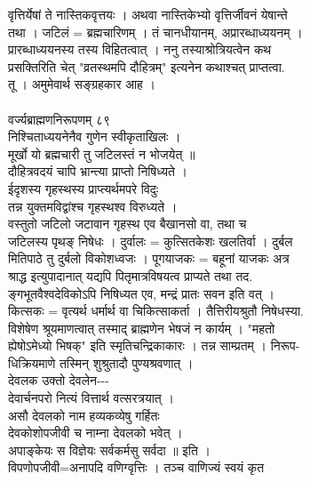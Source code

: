 \documentclass[11pt, openany]{book}
\begin{document}
{{{{{{{{{{{{{{{{{{{{{{{{{{{{{{{{{{{{{{{{{{{{{{{{{{{{{{{{{{{{{{{{{{{{{{{{{{{{{{{{{{{{{{{{{{{{{{{{{{{{{{{{{{{{{{{{{{{{{{{{{{{{{{{{{{{{{{{{{{{{{वृत्तिर्येषां ते नास्तिकवृत्तयः । अथवा नास्तिकेभ्यो वृत्तिर्जीवनं
येषान्ते\\
}{तथा}{ । जटिलं = ब्रह्मचारिणम् । तं चानधीयानम्, अप्रारब्धाध्ययनम् ।\\
प्रारब्धाध्ययनस्य }{तस्य}{ विहितत्वात् । ननु तस्याश्रोत्रियत्वेन कथ\\
प्रसक्तिरिति चेत् "व्रतस्थमपि दौहित्रम्" इत्यनेन कथाश्चत् प्राप्तत्वा.\\
तू । अमुमेवार्थ सङ्ग्रहकार आह ।\\
~\\


{ }{वर्ज्यब्राह्मणनिरूपणम् \textbar{}}{ ८९\\
निश्चिताध्ययनेनैव गुणेन स्वीकृताखिलः ।\\
मूर्खो यो ब्रह्मचारी तु जटिलस्तं न भोजयेत् ॥\\
दौहित्रवदयं चापि भ्रान्त्या प्राप्तो निषिध्यते ।\\
ईदृशस्य गृहस्थस्य प्राप्त्यर्थमपरे विदुः }{\textbar{}\textbar{}}{\\
तन्न युक्तमविद्वांश्च गृहस्थश्व विरुध्यते ।\\
वस्तुतो जटिलो जटावान गृहस्थ एव बैखानसो }{वा, तथा}{ च\\
जटिलस्य पृथङ् निषेधः । दुर्वालः = कुत्सितकेशः खलतिर्वा । दुर्बल\\
मितिपाठे तु दुर्बलो विकोशध्वजः । पूगयाजकः = बहूनां याजकः }{\textbar{}}{
अत्र\\
श्राद्ध इत्युपादानात् यद्यपि पितृमात्रविषयत्व प्राप्यते}{ तथा}{ तद.\\
ङ्गभूतवैश्वदेविकोऽपि निषिध्यत एव, मन्द्रं प्रातः सवन इति वत् ।\\
कित्सकः = वृत्यर्थ धर्मार्थ वा चिकित्साकर्ता । तैत्तिरीयश्रुतौ
निषेधस्या.\\
विशेषेण श्रूयमाणत्वात् तस्माद् ब्राह्मणेन भेषजं न कार्यम् । "महतो\\
ह्येषोऽमेध्यो भिषक्" इति स्मृतिचन्द्रिकाकारः । तन्न साम्प्रतम् ।
निरूप-\\
धिक्रियमाणे तस्मिन् शुश्रुतादौ पुण्यश्रवणात् ।\\
देवलक उक्तो देवलेन-\/-\/-\\
देवार्चनपरो नित्यं वित्तार्थ वत्सरत्रयात् ।\\
असौ देवलको नाम हव्यकव्येषु गर्हितः }{\textbar{}\textbar{}}{\\
देवकोशोपजीवी च नाम्ना देवलको भवेत् ।\\
अपाङ्केयः स विज्ञेयः सर्वकर्मसु सर्वदा ॥ इति ।\\
विपणोपजीवी=अनापदि वणिग्वृत्तिः । तञ्च वाणिज्यं स्वयं कृत\\
}}}}}}}}}}}}}}}}}}}}}}}}}}}}}}}}}}}}}}}}}}}}}}}}}}}}}}}}}}}}}}}}}}}}}}}}}}}}}}}}}}}}}}}}}}}}}}}}}}}}}}}}}}}}}}}}}}}}}}}}}}}}}}}}}}}}}}}}}}}}}}
\end{document}
